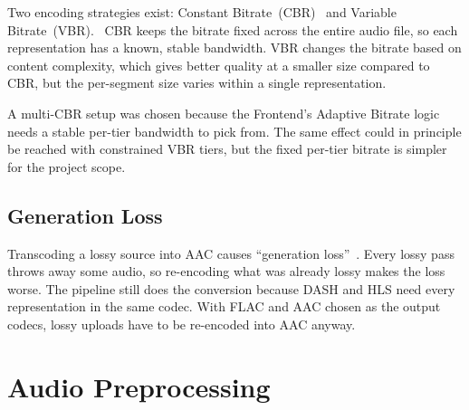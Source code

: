 Two encoding strategies exist: Constant
Bitrate~(CBR)~\parencite{cbr} and Variable
Bitrate~(VBR).~\parencite{vbr} CBR keeps the bitrate fixed across
the entire audio file, so each representation has a known, stable
bandwidth. VBR changes the bitrate based on content complexity, which
gives better quality at a smaller size compared to CBR, but the
per-segment size varies within a single
representation.~\parencite{cbrvbrcomp}

A multi-CBR setup was chosen because the Frontend's Adaptive Bitrate
logic needs a stable per-tier bandwidth to pick from. The same effect
could in principle be reached with constrained VBR tiers, but the
fixed per-tier bitrate is simpler for the project scope.

\subsection{Generation Loss}
Transcoding a lossy source into AAC causes ``generation loss''~\parencite{generation_loss}.
Every lossy pass throws away some audio, so re-encoding what was already
lossy makes the loss worse. The pipeline still does the conversion
because DASH and HLS need every representation in the same codec.
With FLAC and AAC chosen as the output codecs, lossy uploads have to
be re-encoded into AAC anyway.


\section{Audio Preprocessing}

